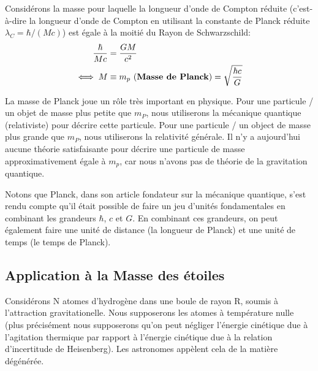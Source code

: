 \documentclass{book}
\begin{document}
Considérons la masse pour laquelle 
la longueur d'onde de Compton réduite (c'est-à-dire la longueur d'onde de Compton en utilisant la constante de Planck réduite $\lambda_C = \hbar/(Mc)$)
est égale à la moitié du Rayon de Schwarzschild: 
\begin{align}
\label{Masse de Planck}
\frac{\hbar}{Mc} &= \frac{GM}{c^2} \notag \\ 
\iff M & \equiv m_p \mbox{ (\textbf{Masse de Planck})} = \sqrt{\frac{\hbar c}{G}}
\end{align}

La masse de Planck joue un rôle très important en physique.
Pour une particule / un objet de masse plus petite que $m_P$, nous utiliserons la mécanique quantique (relativiste) pour décrire cette particule.
Pour une particule / un object de masse plus grande que $m_P$, nous utiliserons la relativité générale.
Il n'y a aujourd'hui aucune théorie satisfaisante pour décrire une particule de masse approximativement égale à $m_p$, car nous n'avons pas de théorie de la gravitation quantique.

Notons que Planck, dans son article fondateur sur la mécanique quantique, 
s'est rendu compte qu'il était possible de faire un jeu d'unités fondamentales en combinant les grandeurs
$\hbar$, $c$ et $G$. En combinant ces grandeurs, on peut également faire une unité de distance (la longueur de Planck) et une unité de temps (le temps de Planck).




\subsection{Application à la Masse des étoiles}
Considérons N atomes d'hydrogène dans une boule de rayon R, soumis à l'attraction gravitationelle. Nous supposerons les atomes à température nulle (plus précisément nous supposerons qu'on peut négliger l'énergie cinétique due à l'agitation thermique par rapport à l'énergie cinétique due à la relation d'incertitude de Heisenberg). Les astronomes appèlent cela de la matière dégénérée.
\end{document}
